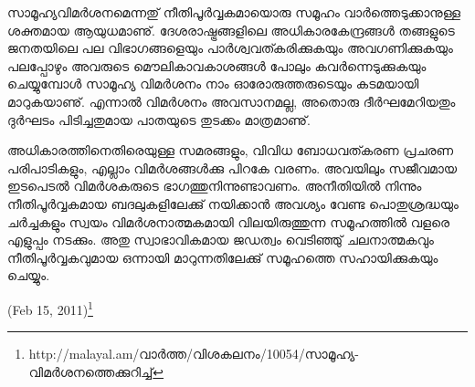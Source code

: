 സാമൂഹ്യവിമര്‍ശനമെന്നതു് നീതിപൂര്‍വ്വകമായൊരു സമൂഹം വാര്‍ത്തെടുക്കാനുള്ള ശക്തമായ ആയുധമാണു്. ദേശരാഷ്ട്രങ്ങളിലെ 
അധികാരകേന്ദ്രങ്ങള്‍ തങ്ങളുടെ ജനതയിലെ പല വിഭാഗങ്ങളെയും പാര്‍ശ്വവത്കരിക്കുകയും അവഗണിക്കുകയും പലപ്പോഴും അവരുടെ 
മൌലികാവകാശങ്ങള്‍ പോലും കവര്‍ന്നെടുക്കുകയും ചെയ്യുമ്പോള്‍ സാമൂഹ്യ വിമര്‍ശനം നാം ഓരോരുത്തരുടെയും കടമയായി മാറുകയാണു്. 
എന്നാല്‍ വിമര്‍ശനം അവസാനമല്ല, അതൊരു ദീര്‍ഘമേറിയതും ദുര്‍ഘടം പിടിച്ചതുമായ പാതയുടെ തുടക്കം മാത്രമാണു്.

അധികാരത്തിനെതിരെയുള്ള സമരങ്ങളും, വിവിധ ബോധവത്കരണ പ്രചരണ പരിപാടികളും, എല്ലാം വിമര്‍ശങ്ങള്‍ക്കു പിറകേ വരണം.
 അവയിലും സജീവമായ ഇടപെടല്‍ വിമര്‍ശകരുടെ ഭാഗത്തുനിന്നുണ്ടാവണം. അനീതിയില്‍ നിന്നും നീതിപൂര്‍വ്വകമായ ബദലുകളിലേക്കു് 
 നയിക്കാന്‍ അവശ്യം വേണ്ട പൊതുശ്രദ്ധയും ചര്‍ച്ചകളും സ്വയം വിമര്‍ശനാത്മകമായി വിലയിരുത്തുന്ന സമൂഹത്തില്‍ വളരെ എളുപ്പം നടക്കും. 
 അതു സ്വാഭാവികമായ ജഡത്വം വെടിഞ്ഞു് ചലനാത്മകവും നീതിപൂര്‍വ്വകവുമായ ഒന്നായി മാറുന്നതിലേക്കു് സമൂഹത്തെ സഹായിക്കുകയും ചെയ്യും.

(Feb 15, 2011)\footnote{http://malayal.am/വാര്‍ത്ത/വിശകലനം/10054/സാമൂഹ്യ-വിമര്‍ശനത്തെക്കുറിച്ച്}
\newpage
